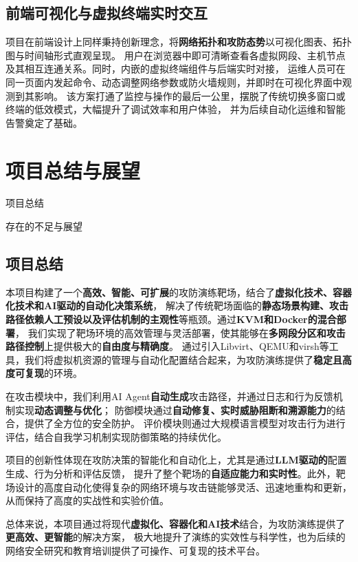 \documentclass[lang=cn,10pt]{elegantbook}
\begin{document}
\section{前端可视化与虚拟终端实时交互}  
项目在前端设计上同样秉持创新理念，将\textbf{网络拓扑和攻防态势}以可视化图表、拓扑图与时间轴形式直观呈现。
用户在浏览器中即可清晰查看各虚拟网段、主机节点及其相互连通关系。同时，内嵌的虚拟终端组件与后端实时对接，
运维人员可在同一页面内发起命令、动态调整网络参数或防火墙规则，并即时在可视化界面中观测到其影响。
该方案打通了监控与操作的最后一公里，摆脱了传统切换多窗口或终端的低效模式，大幅提升了调试效率和用户体验，
并为后续自动化运维和智能告警奠定了基础。


\chapter{项目总结与展望}
\begin{introduction}
  \item 项目总结
  \item 存在的不足与展望
\end{introduction}

\section{项目总结}

本项目构建了一个\textbf{高效、智能、可扩展}的攻防演练靶场，结合了\textbf{虚拟化技术、容器化技术和AI驱动的自动化决策系统}，
解决了传统靶场面临的\textbf{静态场景构建、攻击路径依赖人工预设以及评估机制的主观性}等瓶颈。通过\textbf{KVM和Docker的混合部署}，
我们实现了靶场环境的高效管理与灵活部署，使其能够在\textbf{多网段分区和攻击路径控制}上提供极大的\textbf{自由度与精确度}。
通过引入Libvirt、QEMU和virsh等工具，我们将虚拟机资源的管理与自动化配置结合起来，为攻防演练提供了\textbf{稳定且高度可复现}的环境。

在攻击模块中，我们利用AI Agent\textbf{自动生成}攻击路径，并通过日志和行为反馈机制实现\textbf{动态调整与优化}；
防御模块通过\textbf{自动修复、实时威胁阻断和溯源能力}的结合，提供了全方位的安全防护。
评价模块则通过大规模语言模型对攻击行为进行评估，结合自我学习机制实现防御策略的持续优化。

项目的创新性体现在攻防决策的智能化和自动化上，尤其是通过\textbf{LLM驱动的}配置生成、行为分析和评估反馈，
提升了整个靶场的\textbf{自适应能力和实时性}。此外，靶场设计的高度自动化使得复杂的网络环境与攻击链能够灵活、迅速地重构和更新，
从而保持了高度的实战性和实验价值。

总体来说，本项目通过将现代\textbf{虚拟化、容器化和AI技术}结合，为攻防演练提供了\textbf{更高效、更智能}的解决方案，
极大地提升了演练的实效性与科学性，也为后续的网络安全研究和教育培训提供了可操作、可复现的技术平台。
\end{document}
